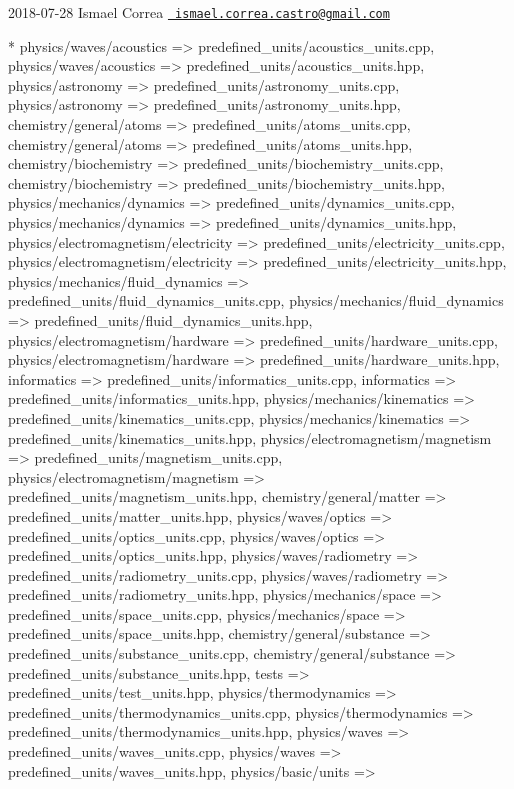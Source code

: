  2018-\/07-\/28 Ismael Correa \href{mailto:ismael.correa.castro@gmail.com}{\texttt{ ismael.\+correa.\+castro@gmail.\+com}} \begin{DoxyVerb}* {physics/waves/acoustics =>
predefined_units}/acoustics_units.cpp, {physics/waves/acoustics =>
predefined_units}/acoustics_units.hpp, {physics/astronomy =>
predefined_units}/astronomy_units.cpp, {physics/astronomy =>
predefined_units}/astronomy_units.hpp, {chemistry/general/atoms =>
predefined_units}/atoms_units.cpp, {chemistry/general/atoms =>
predefined_units}/atoms_units.hpp, {chemistry/biochemistry =>
predefined_units}/biochemistry_units.cpp, {chemistry/biochemistry
=> predefined_units}/biochemistry_units.hpp,
{physics/mechanics/dynamics =>
predefined_units}/dynamics_units.cpp, {physics/mechanics/dynamics
=> predefined_units}/dynamics_units.hpp,
{physics/electromagnetism/electricity =>
predefined_units}/electricity_units.cpp,
{physics/electromagnetism/electricity =>
predefined_units}/electricity_units.hpp,
{physics/mechanics/fluid_dynamics =>
predefined_units}/fluid_dynamics_units.cpp,
{physics/mechanics/fluid_dynamics =>
predefined_units}/fluid_dynamics_units.hpp,
{physics/electromagnetism/hardware =>
predefined_units}/hardware_units.cpp,
{physics/electromagnetism/hardware =>
predefined_units}/hardware_units.hpp, {informatics =>
predefined_units}/informatics_units.cpp, {informatics =>
predefined_units}/informatics_units.hpp,
{physics/mechanics/kinematics =>
predefined_units}/kinematics_units.cpp,
{physics/mechanics/kinematics =>
predefined_units}/kinematics_units.hpp,
{physics/electromagnetism/magnetism =>
predefined_units}/magnetism_units.cpp,
{physics/electromagnetism/magnetism =>
predefined_units}/magnetism_units.hpp, {chemistry/general/matter =>
predefined_units}/matter_units.hpp, {physics/waves/optics =>
predefined_units}/optics_units.cpp, {physics/waves/optics =>
predefined_units}/optics_units.hpp, {physics/waves/radiometry =>
predefined_units}/radiometry_units.cpp, {physics/waves/radiometry
=> predefined_units}/radiometry_units.hpp, {physics/mechanics/space
=> predefined_units}/space_units.cpp, {physics/mechanics/space =>
predefined_units}/space_units.hpp, {chemistry/general/substance =>
predefined_units}/substance_units.cpp, {chemistry/general/substance
=> predefined_units}/substance_units.hpp, {tests =>
predefined_units}/test_units.hpp, {physics/thermodynamics =>
predefined_units}/thermodynamics_units.cpp, {physics/thermodynamics
=> predefined_units}/thermodynamics_units.hpp, {physics/waves =>
predefined_units}/waves_units.cpp, {physics/waves =>
predefined_units}/waves_units.hpp, {physics/basic/units =>
}
\end{DoxyVerb}
